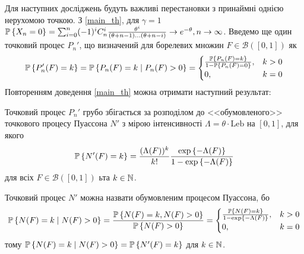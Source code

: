 Для наступних досліджень будуть важливі перестановки з принаймні однією нерухомою точкою.
З \ref{main_th}, для $\gamma = 1$ $\P{X_n = 0} = \sum_{i=0}^{n}
(-1)^i C_{n}^i \frac{\theta^i}{
    (\theta + n - 1) \dots (\theta + n - i)
} \to e^{-\theta}, n \to \infty$. 
Введемо ще один точковий процес $P_n'$, що визначений для борелевих множин $F \in \mathcal{B}([0, 1])$ як 
\begin{gather}
    \P{P_n' (F) = k} = \P{P_n(F) = k \mid P_n(F) > 0} = \begin{cases}
        \frac{\P{P_n(F) = k}}{1 - \P{P_n(F) = 0}}, & k > 0 \\
        0, & k = 0
    \end{cases} 
\end{gather}
Повторенням доведення \ref{main_th} можна отримати наступний результат:
\begin{theorem}\label{cond_th}
    Точковий процес $P_n'$ грубо збігається за розподілом до
    <<обумовленого>> точкового процесу Пуассона $N'$ 
    з мірою інтенсивності $\Lambda = \theta \cdot \mathrm{Leb}$ на $[0, 1]$, для якого
    \begin{gather*}
        \P{N'(F) = k} = 
        \frac{(\Lambda(F))^k}{k!}
        \frac{
            \exp\left\{-\Lambda(F)\right\}
        }{
            1 - \exp\left\{-\Lambda(F)\right\}
        }
    \end{gather*}
    для всіх $F \in \mathcal{B}([0, 1])$ ьта $k \in \N$.
\end{theorem}
Точковий процес $N'$ можна назвати обумовленим процесом Пуассона, бо
\begin{gather*}
    \P{N(F) = k \mid N(F) > 0} = \frac{\P{N(F) = k, N(F) > 0}}{\P{N(F) > 0}} =
    \begin{cases}
        \frac{\P{N(F) = k}}{1 - \exp\left\{-\Lambda(F)\right\}}, & k > 0 \\
        0, & k = 0
    \end{cases}
\end{gather*}
тому $\P{N(F) = k \mid N(F) > 0} = \P{N'(F) = k}$ для $k \in \N$.